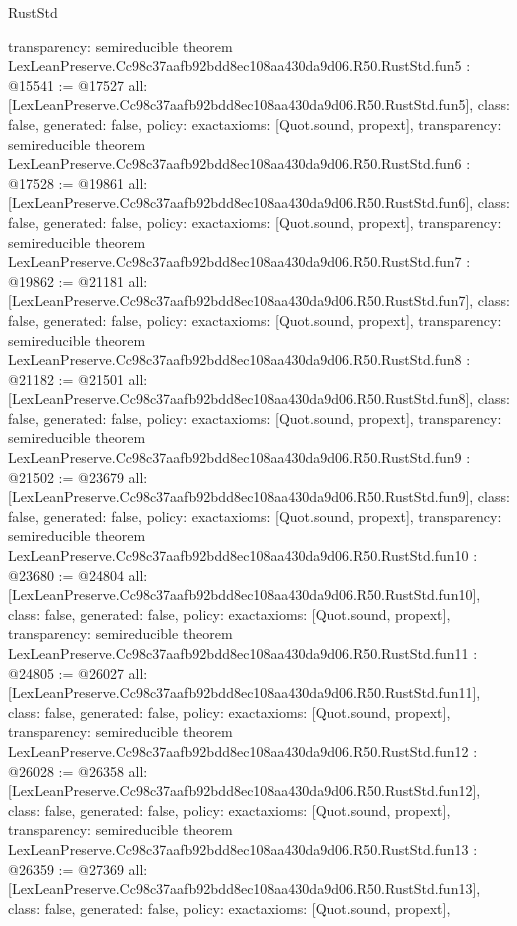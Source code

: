 \begin{lexlean}{RustStd}
\begin{coremodule}
{  transparency: semireducible
}
theorem LexLeanPreserve.Cc98c37aafb92bdd8ec108aa430da9d06.R50.RustStd.fun5 : @15541 := @17527 {
  all: [LexLeanPreserve.Cc98c37aafb92bdd8ec108aa430da9d06.R50.RustStd.fun5],
  class: false,
  generated: false,
  policy: exact{axioms: [Quot.sound, propext]},
  transparency: semireducible
}
theorem LexLeanPreserve.Cc98c37aafb92bdd8ec108aa430da9d06.R50.RustStd.fun6 : @17528 := @19861 {
  all: [LexLeanPreserve.Cc98c37aafb92bdd8ec108aa430da9d06.R50.RustStd.fun6],
  class: false,
  generated: false,
  policy: exact{axioms: [Quot.sound, propext]},
  transparency: semireducible
}
theorem LexLeanPreserve.Cc98c37aafb92bdd8ec108aa430da9d06.R50.RustStd.fun7 : @19862 := @21181 {
  all: [LexLeanPreserve.Cc98c37aafb92bdd8ec108aa430da9d06.R50.RustStd.fun7],
  class: false,
  generated: false,
  policy: exact{axioms: [Quot.sound, propext]},
  transparency: semireducible
}
theorem LexLeanPreserve.Cc98c37aafb92bdd8ec108aa430da9d06.R50.RustStd.fun8 : @21182 := @21501 {
  all: [LexLeanPreserve.Cc98c37aafb92bdd8ec108aa430da9d06.R50.RustStd.fun8],
  class: false,
  generated: false,
  policy: exact{axioms: [Quot.sound, propext]},
  transparency: semireducible
}
theorem LexLeanPreserve.Cc98c37aafb92bdd8ec108aa430da9d06.R50.RustStd.fun9 : @21502 := @23679 {
  all: [LexLeanPreserve.Cc98c37aafb92bdd8ec108aa430da9d06.R50.RustStd.fun9],
  class: false,
  generated: false,
  policy: exact{axioms: [Quot.sound, propext]},
  transparency: semireducible
}
theorem LexLeanPreserve.Cc98c37aafb92bdd8ec108aa430da9d06.R50.RustStd.fun10 : @23680 := @24804 {
  all: [LexLeanPreserve.Cc98c37aafb92bdd8ec108aa430da9d06.R50.RustStd.fun10],
  class: false,
  generated: false,
  policy: exact{axioms: [Quot.sound, propext]},
  transparency: semireducible
}
theorem LexLeanPreserve.Cc98c37aafb92bdd8ec108aa430da9d06.R50.RustStd.fun11 : @24805 := @26027 {
  all: [LexLeanPreserve.Cc98c37aafb92bdd8ec108aa430da9d06.R50.RustStd.fun11],
  class: false,
  generated: false,
  policy: exact{axioms: [Quot.sound, propext]},
  transparency: semireducible
}
theorem LexLeanPreserve.Cc98c37aafb92bdd8ec108aa430da9d06.R50.RustStd.fun12 : @26028 := @26358 {
  all: [LexLeanPreserve.Cc98c37aafb92bdd8ec108aa430da9d06.R50.RustStd.fun12],
  class: false,
  generated: false,
  policy: exact{axioms: [Quot.sound, propext]},
  transparency: semireducible
}
theorem LexLeanPreserve.Cc98c37aafb92bdd8ec108aa430da9d06.R50.RustStd.fun13 : @26359 := @27369 {
  all: [LexLeanPreserve.Cc98c37aafb92bdd8ec108aa430da9d06.R50.RustStd.fun13],
  class: false,
  generated: false,
  policy: exact{axioms: [Quot.sound, propext]},
}
\end{coremodule}
\end{lexlean}
